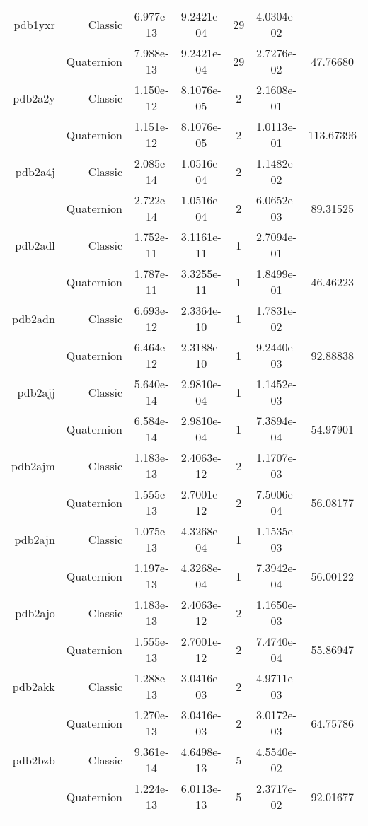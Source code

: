 \begin{xltabular}{\textwidth}{r|rS[table-format=1.3e+2]S[table-format=1.4e+2]cS[table-format=1.4e+2]S[table-format=-1.5]}
pdb1yxr & Classic & 6.977e-13 & 9.2421e-04 & 29 & 4.0304e-02 & \\
& Quaternion & 7.988e-13 & 9.2421e-04 & 29 & 2.7276e-02 & 47.76680\\  \addlinespace
pdb2a2y & Classic & 1.150e-12 & 8.1076e-05 & 2 & 2.1608e-01 & \\
& Quaternion & 1.151e-12 & 8.1076e-05 & 2 & 1.0113e-01 & 113.67396\\  \addlinespace
pdb2a4j & Classic & 2.085e-14 & 1.0516e-04 & 2 & 1.1482e-02 & \\
& Quaternion & 2.722e-14 & 1.0516e-04 & 2 & 6.0652e-03 & 89.31525\\  \addlinespace
pdb2adl & Classic & 1.752e-11 & 3.1161e-11 & 1 & 2.7094e-01 & \\
& Quaternion & 1.787e-11 & 3.3255e-11 & 1 & 1.8499e-01 & 46.46223\\  \addlinespace
pdb2adn & Classic & 6.693e-12 & 2.3364e-10 & 1 & 1.7831e-02 & \\
& Quaternion & 6.464e-12 & 2.3188e-10 & 1 & 9.2440e-03 & 92.88838\\  \addlinespace
pdb2ajj & Classic & 5.640e-14 & 2.9810e-04 & 1 & 1.1452e-03 & \\
& Quaternion & 6.584e-14 & 2.9810e-04 & 1 & 7.3894e-04 & 54.97901\\  \addlinespace
pdb2ajm & Classic & 1.183e-13 & 2.4063e-12 & 2 & 1.1707e-03 & \\
& Quaternion & 1.555e-13 & 2.7001e-12 & 2 & 7.5006e-04 & 56.08177\\  \addlinespace
pdb2ajn & Classic & 1.075e-13 & 4.3268e-04 & 1 & 1.1535e-03 & \\
& Quaternion & 1.197e-13 & 4.3268e-04 & 1 & 7.3942e-04 & 56.00122\\  \addlinespace
pdb2ajo & Classic & 1.183e-13 & 2.4063e-12 & 2 & 1.1650e-03 & \\
& Quaternion & 1.555e-13 & 2.7001e-12 & 2 & 7.4740e-04 & 55.86947\\  \addlinespace
pdb2akk & Classic & 1.288e-13 & 3.0416e-03 & 2 & 4.9711e-03 & \\
& Quaternion & 1.270e-13 & 3.0416e-03 & 2 & 3.0172e-03 & 64.75786\\  \addlinespace
pdb2bzb & Classic & 9.361e-14 & 4.6498e-13 & 5 & 4.5540e-02 & \\
& Quaternion & 1.224e-13 & 6.0113e-13 & 5 & 2.3717e-02 & 92.01677\\  \addlinespace

\end{xltabular}
